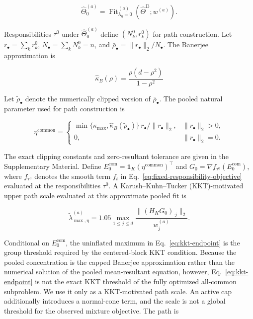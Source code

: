 \documentclass[preprint,12pt,authoryear]{elsarticle}
\begin{document}
\[
\widehat\Theta_0^{(a)}
=\operatorname{Fit}_{\lambda_\eta=0}^{(a)}
\left(\widehat\Theta^{\mathrm D};w^{(a)}\right).
\]

Responsibilities $\tau^0$ under $\widehat\Theta_0^{(a)}$ define
$(N_k^0,r_k^0)$ for path construction. Let
$r_\bullet=\sum_k r_k^0$, $N_\bullet=\sum_kN_k^0=n$, and
$\bar\rho_\bullet=\lVert r_\bullet\rVert_2/N_\bullet$. The Banerjee
approximation \citep[Eq.~(4.4)]{banerjee2005vmf} is

\begin{equation}
\label{eq:banerjee-pooled}
\widehat\kappa_B(\rho)
=\frac{\rho(d-\rho^2)}{1-\rho^2}
\end{equation}

Let $\widetilde\rho_\bullet$ denote the numerically clipped version of
$\bar\rho_\bullet$. The pooled natural parameter used for path construction is

\[
\eta^{\mathrm{common}}
=
\begin{cases}
\min\{\kappa_{\max},\widehat\kappa_B(\widetilde\rho_\bullet)\}
\,r_\bullet/\lVert r_\bullet\rVert_2,
& \lVert r_\bullet\rVert_2>0,\\[3pt]
0, & \lVert r_\bullet\rVert_2=0.
\end{cases}
\]

The exact clipping constants and zero-resultant tolerance are given in the
Supplementary Material. Define
$E_0^{\mathrm{com}}=\mathbf 1_K(\eta^{\mathrm{common}})^\top$ and
$G_0=\nabla f_{\tau^0}(E_0^{\mathrm{com}})$, where $f_{\tau^0}$ denotes the
smooth term $f_t$ in Eq.~\eqref{eq:fixed-responsibility-objective} evaluated
at the responsibilities $\tau^0$. A Karush--Kuhn--Tucker (KKT)-motivated
upper path scale evaluated at this approximate pooled fit is

\begin{equation}
\label{eq:kkt-endpoint}
\widetilde\lambda_{\max,\eta}^{(a)}
=1.05\max_{1\leq j\leq d}
\frac{\lVert (H_KG_0)_{\cdot j}\rVert_2}{w_j^{(a)}}.
\end{equation}

Conditional on $E_0^{\mathrm{com}}$, the uninflated maximum in
Eq.~\eqref{eq:kkt-endpoint} is the group threshold required by the
centered-block KKT condition. Because the pooled concentration is the capped Banerjee
approximation rather than the numerical solution of the pooled mean-resultant
equation, however, Eq.~\eqref{eq:kkt-endpoint} is not the exact KKT threshold
of the fully optimized all-common subproblem. We use it only as a
KKT-motivated path scale. An active cap additionally introduces a normal-cone
term, and the scale is not a global threshold for the observed mixture
objective. The path is
\end{document}
